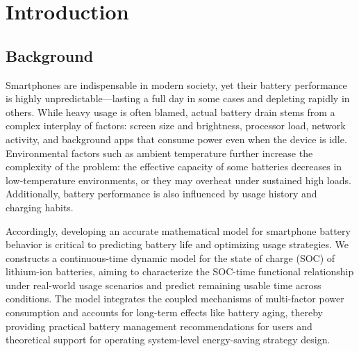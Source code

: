 \documentclass{mcmthesis}  %
\begin{document}
\begin{abstract}
		Finally, considering the impact of battery aging, we provide recommendations for users and operating systems. \textbf{We advise users to activate core modules as needed, and recommend that operating systems implement fine‑grained control of core parameters, among other measures}. The model is further applied to a smart band, indicating its \textbf{ability for device generalization}.
		\begin{keywords}  %
			Differential Equations, Random Simulation, Monte Carlo Simulation, State of Charge (SOC), Battery Life
		\end{keywords}  %
	\end{abstract}  %
	\maketitle  %
	
	\setcounter{page}{2} %
	\tableofcontents  %

	
	
	\newpage  %
	\section{Introduction}  %
	\subsection{Background}  %
	Smartphones are indispensable in modern society, yet their battery performance is highly unpredictable—lasting a full day in some cases and depleting rapidly in others. While heavy usage is often blamed, actual battery drain stems from a complex interplay of factors: screen size and brightness, processor load, network activity, and background apps that consume power even when the device is idle. Environmental factors such as ambient temperature further increase the complexity of the problem: the effective capacity of some batteries decreases in low‑temperature environments, or they may overheat under sustained high loads. Additionally, battery performance is also influenced by usage history and charging habits.
	
	Accordingly, developing an accurate mathematical model for smartphone battery behavior is critical to predicting battery life and optimizing usage strategies. We constructs a continuous-time dynamic model for the state of charge (SOC) of lithium-ion batteries, aiming to characterize the SOC-time functional relationship under real-world usage scenarios and predict remaining usable time across conditions. The model integrates the coupled mechanisms of multi-factor power consumption and accounts for long-term effects like battery aging, thereby providing practical battery management recommendations for users and theoretical support for operating system-level energy-saving strategy design.
	
\end{document}
